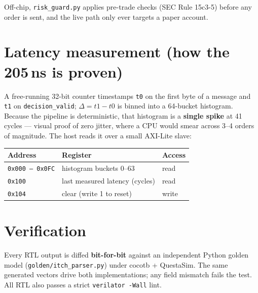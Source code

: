 \documentclass[10pt,a4paper]{article}
\begin{document}
Off-chip, \texttt{risk\_guard.py} applies pre-trade checks (SEC Rule 15c3-5) before any
order is sent, and the live path only ever targets a paper account.

\section{Latency measurement (how the 205\,ns is proven)}

A free-running 32-bit counter timestamps \texttt{t0} on the first byte of a message and
\texttt{t1} on \texttt{decision\_valid}; $\Delta = t1-t0$ is binned into a 64-bucket
histogram. Because the pipeline is deterministic, that histogram is a \textbf{single spike}
at 41 cycles --- visual proof of zero jitter, where a CPU would smear across 3--4 orders of
magnitude. The host reads it over a small AXI-Lite slave:

\begin{center}
\renewcommand{\arraystretch}{1.1}
\begin{tabular}{@{}l l l@{}}
\toprule
\textbf{Address} & \textbf{Register} & \textbf{Access} \\
\midrule
\texttt{0x000 -- 0x0FC} & histogram buckets 0--63 & read \\
\texttt{0x100}          & last measured latency (cycles) & read \\
\texttt{0x104}          & clear (write 1 to reset) & write \\
\bottomrule
\end{tabular}
\end{center}

\section{Verification}

Every RTL output is diffed \textbf{bit-for-bit} against an independent Python golden model
(\texttt{golden/itch\_parser.py}) under cocotb + QuestaSim. The same generated vectors drive
both implementations; any field mismatch fails the test. All RTL also passes a strict
\texttt{verilator -Wall} lint.
\end{document}
